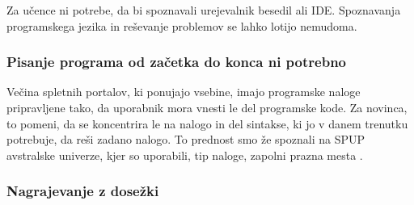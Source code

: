 Za učence ni potrebe, da bi spoznavali urejevalnik besedil ali
IDE. Spoznavanja programskega jezika in reševanje problemov se lahko
lotijo nemudoma.


\subsubsection{Pisanje programa od začetka do konca ni potrebno}
\label{sec:pisanj_celega_progama}

Večina spletnih portalov, ki ponujajo vsebine, imajo programske naloge
pripravljene tako, da uporabnik mora vnesti le del programske kode. Za
novinca, to pomeni, da se koncentrira le na nalogo in del sintakse, ki
jo v danem trenutku potrebuje, da reši zadano nalogo. To prednost smo
že spoznali na SPUP avstralske univerze, kjer so uporabili, tip
naloge, zapolni prazna mesta \cite{thesisAWebP}.

\subsubsection{Nagrajevanje z dosežki}
\label{sec:nagrajevanje_s_dosežkov}






